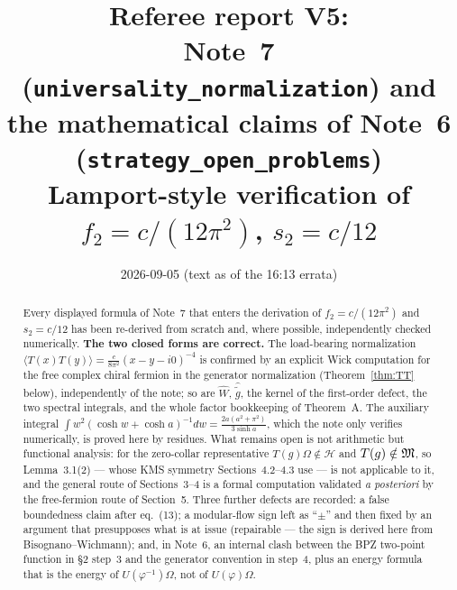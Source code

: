 \documentclass[11pt]{article}
\title{\vspace{-1.4cm}\color{navy}\bfseries Referee report V5:\\ Note~7 (\texttt{universality\_normalization}) and the mathematical claims of Note~6 (\texttt{strategy\_open\_problems})\\[.3em]\large Lamport-style verification of $f_2=c/(12\pi^2)$, $s_2=c/12$}
\author{}\date{2026-09-05 (text as of the 16:13 errata)}
\begin{document}
\maketitle
\vspace{-1.2em}
\begin{abstract}\noindent
Every displayed formula of Note~7 that enters the derivation of $f_2=c/(12\pi^2)$ and $s_2=c/12$ has been
re-derived from scratch and, where possible, independently checked numerically.  \textbf{The two closed forms are
correct.}  The load-bearing normalization $\langle T(x)T(y)\rangle=\frac{c}{8\pi^2}(x-y-i0)^{-4}$ is confirmed by an
explicit Wick computation for the free complex chiral fermion in the generator normalization (Theorem~\ref{thm:TT}
below), independently of the note; so are $\widehat W$, $\widehat{\widetilde g}$, the kernel of the first-order
defect, the two spectral integrals, and the whole factor bookkeeping of Theorem~A.  The auxiliary integral
$\int w^2(\cosh w+\cosh a)^{-1}dw=\frac{2a(a^2+\pi^2)}{3\sinh a}$, which the note only verifies numerically, is
proved here by residues.  What remains open is not arithmetic but functional analysis: for the zero-collar
representative $T(g)\Omega\notin\mathcal H$ and $T(g)\notin\mathfrak M$, so Lemma~3.1(2) --- whose KMS symmetry Sections~4.2--4.3
use --- is not applicable to it, and the general route of Sections~3--4 is a formal computation validated
\emph{a posteriori} by the free-fermion route of Section~5.  Three further defects are recorded: a false
boundedness claim after eq.~(13); a modular-flow sign left as ``$\pm$'' and then fixed by an argument that
presupposes what is at issue (repairable --- the sign is derived here from Bisognano--Wichmann); and, in Note~6,
an internal clash between the BPZ two-point function in \S2 step~3 and the generator convention in step~4,
plus an energy formula that is the energy of $U(\varphi^{-1})\Omega$, not of $U(\varphi)\Omega$.
\end{abstract}
\tableofcontents
\bigskip
\end{document}
